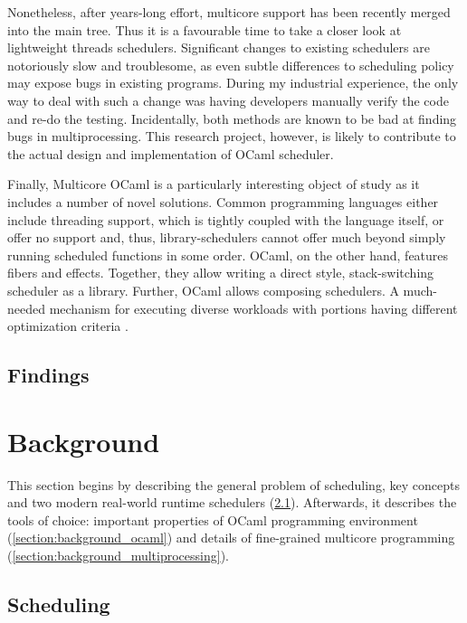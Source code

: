 \documentclass[12pt,a4paper,twoside]{report}
\begin{document}
Nonetheless, after years-long effort, multicore support has been recently merged into the main tree. Thus it is a favourable time to take a closer look at lightweight threads schedulers. Significant changes to existing schedulers are notoriously slow and troublesome, as even subtle differences to scheduling policy may expose bugs in existing programs. During my industrial experience, the only way to deal with such a change was having developers manually verify the code and re-do the testing. Incidentally, both methods are known to be bad at finding bugs in multiprocessing. This research project, however, is likely to contribute to the actual design and implementation of OCaml scheduler. 

Finally, Multicore OCaml is a particularly interesting object of study as it includes a number of novel solutions. Common programming languages either include threading support, which is tightly coupled with the language itself, or offer no support and, thus, library-schedulers cannot offer much beyond simply running scheduled functions in some order. OCaml, on the other hand, features fibers and effects. Together, they allow writing a direct style, stack-switching scheduler as a library. Further, OCaml allows composing schedulers. A much-needed mechanism for executing diverse workloads with portions having different optimization criteria \cite{Tennenhouse89layeredmultiplexing}.


\section{Findings}
\label{section:findings}


\chapter{Background}


This section begins by describing the general problem of scheduling, key concepts and two modern real-world runtime schedulers (\ref{section:background_schedulers}). Afterwards, it describes the tools of choice: important properties of OCaml programming environment (\ref{section:background_ocaml}) and details of fine-grained multicore programming (\ref{section:background_multiprocessing}).



\section{Scheduling}
\label{section:background_schedulers}
\end{document}
